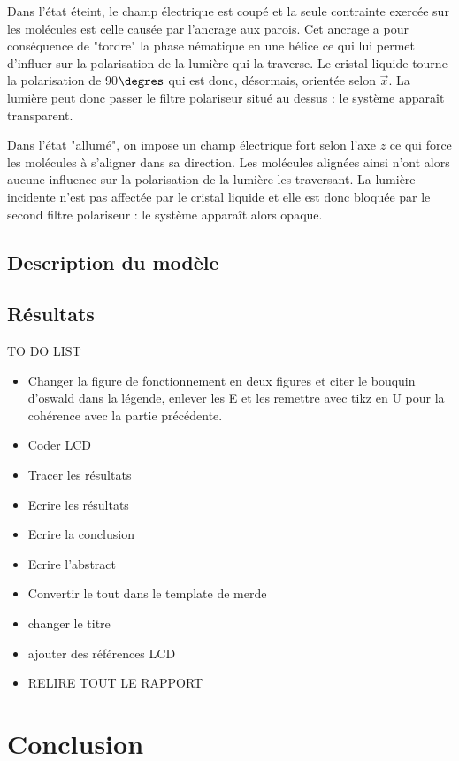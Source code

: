 \documentclass[11pt,a4paper]{article}
\numberwithin{equation}{section}
\begin{document}
Dans l'état éteint, le champ électrique est coupé et la seule contrainte exercée sur les molécules est celle causée par l'ancrage aux parois. Cet ancrage a pour conséquence de "tordre" la phase nématique en une hélice ce qui lui permet d'influer sur la polarisation de la lumière qui la traverse. Le cristal liquide tourne la polarisation de 90$\degres$ qui est donc, désormais, orientée selon $\vec{x}$. La lumière peut donc passer le filtre polariseur situé au dessus : le système apparaît transparent.
\medskip

Dans l'état "allumé", on impose un champ électrique fort selon l'axe $z$ ce qui force les molécules à s'aligner dans sa direction. Les molécules alignées ainsi n'ont alors aucune influence sur la polarisation de la lumière les traversant. La lumière incidente n'est pas affectée par le cristal liquide et elle est donc bloquée par le second filtre polariseur : le système apparaît alors opaque.
\medskip

\subsection{Description du modèle}

\subsection{Résultats}

TO DO LIST
\begin{itemize}
\item Changer la figure de fonctionnement en deux figures et citer le bouquin d'oswald dans la légende, enlever les E et les remettre avec tikz en U pour la cohérence avec la partie précédente.
\item Coder LCD
\item Tracer les résultats
\item Ecrire les résultats
\item Ecrire la conclusion
\item Ecrire l'abstract
\item Convertir le tout dans le template de merde
\item changer le titre
\item ajouter des références LCD
\item RELIRE TOUT LE RAPPORT
\end{itemize}

\newpage
\section*{Conclusion}


\newpage


 
\end{document}
